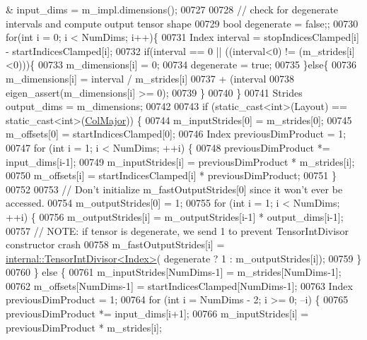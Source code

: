 \begin{DoxyCode}
      & input\_dims = m\_impl.dimensions();
00727 
00728     \textcolor{comment}{// check for degenerate intervals and compute output tensor shape}
00729     \textcolor{keywordtype}{bool} degenerate = \textcolor{keyword}{false};;
00730     \textcolor{keywordflow}{for}(\textcolor{keywordtype}{int} i = 0; i < NumDims; i++)\{
00731       Index interval = stopIndicesClamped[i] - startIndicesClamped[i];
00732       \textcolor{keywordflow}{if}(interval == 0 || ((interval<0) != (m\_strides[i]<0)))\{
00733         m\_dimensions[i] = 0;
00734         degenerate = \textcolor{keyword}{true};
00735       \}\textcolor{keywordflow}{else}\{
00736         m\_dimensions[i] = interval / m\_strides[i]
00737                           + (interval %
00738         eigen\_assert(m\_dimensions[i] >= 0);
00739       \}
00740     \}
00741     Strides output\_dims = m\_dimensions;
00742 
00743     \textcolor{keywordflow}{if} (static\_cast<int>(Layout) == static\_cast<int>(\hyperlink{group__enums_ggaacded1a18ae58b0f554751f6cdf9eb13a0cbd4bdd0abcfc0224c5fcb5e4f6669a}{ColMajor})) \{
00744       m\_inputStrides[0] = m\_strides[0];
00745       m\_offsets[0] = startIndicesClamped[0];
00746       Index previousDimProduct = 1;
00747       \textcolor{keywordflow}{for} (\textcolor{keywordtype}{int} i = 1; i < NumDims; ++i) \{
00748         previousDimProduct *= input\_dims[i-1];
00749         m\_inputStrides[i] = previousDimProduct * m\_strides[i];
00750         m\_offsets[i] = startIndicesClamped[i] * previousDimProduct;
00751       \}
00752 
00753       \textcolor{comment}{// Don't initialize m\_fastOutputStrides[0] since it won't ever be accessed.}
00754       m\_outputStrides[0] = 1;
00755       \textcolor{keywordflow}{for} (\textcolor{keywordtype}{int} i = 1; i < NumDims; ++i) \{
00756         m\_outputStrides[i] = m\_outputStrides[i-1] * output\_dims[i-1];
00757         \textcolor{comment}{// NOTE: if tensor is degenerate, we send 1 to prevent TensorIntDivisor constructor crash}
00758         m\_fastOutputStrides[i] = \hyperlink{struct_eigen_1_1internal_1_1_tensor_int_divisor}{internal::TensorIntDivisor<Index>}(
      degenerate ? 1 : m\_outputStrides[i]);
00759       \}
00760     \} \textcolor{keywordflow}{else} \{
00761       m\_inputStrides[NumDims-1] = m\_strides[NumDims-1];
00762       m\_offsets[NumDims-1] = startIndicesClamped[NumDims-1];
00763       Index previousDimProduct = 1;
00764       \textcolor{keywordflow}{for} (\textcolor{keywordtype}{int} i = NumDims - 2; i >= 0; --i) \{
00765         previousDimProduct *= input\_dims[i+1];
00766         m\_inputStrides[i] = previousDimProduct * m\_strides[i];

\end{DoxyCode}
